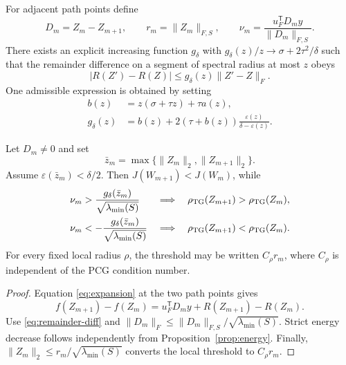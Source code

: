 \documentclass[smallextended]{svjour3}
\newcommand{\T}{\mathsf{T}}
\newcommand{\norm}[1]{\lVert#1\rVert}
\newcommand{\abs}[1]{\lvert#1\rvert}
\begin{document}
For adjacent path points define
\begin{equation}\label{eq:step}
 D_m=Z_m-Z_{m+1},\qquad
 r_m=\norm{Z_m}_{F,S},\qquad
 \nu_m=\frac{u_F^{\T}D_my}{\norm{D_m}_{F,S}}.
\end{equation}
There exists an explicit increasing function $g_\delta$ with
$g_\delta(z)/z\to\sigma+2\tau^2/\delta$ such that the remainder difference on a segment of spectral radius at most $z$ obeys
\begin{equation}\label{eq:remainder-diff}
 \abs{R(Z')-R(Z)}\le g_\delta(z)\norm{Z'-Z}_F.
\end{equation}
One admissible expression is obtained by setting
\begin{align*}
 b(z)&=z(\sigma+\tau z)+\tau a(z),\\
 g_\delta(z)&=b(z)+2(\tau+b(z))\frac{\varepsilon(z)}{\delta-\varepsilon(z)}.
\end{align*}

\begin{theorem}\label{thm:step}
Let $D_m\ne0$ and set
\begin{equation*}
 \bar z_m=\max\{\norm{Z_m}_2,\norm{Z_{m+1}}_2\}.
\end{equation*}
Assume $\varepsilon(\bar z_m)<\delta/2$. Then
$J(W_{m+1})<J(W_m)$, while
\begin{align}
 \nu_m&>\frac{g_\delta(\bar z_m)}{\sqrt{\lambda_{\min}(S)}}
 &&\Longrightarrow\quad \rho_{\rm TG}(Z_{m+1})>\rho_{\rm TG}(Z_m),\label{eq:worse}\\
 \nu_m&<-\frac{g_\delta(\bar z_m)}{\sqrt{\lambda_{\min}(S)}}
 &&\Longrightarrow\quad \rho_{\rm TG}(Z_{m+1})<\rho_{\rm TG}(Z_m).\label{eq:better}
\end{align}
For every fixed local radius $\rho$, the threshold may be written $C_\rho r_m$, where $C_\rho$ is independent of the PCG condition number.
\end{theorem}
\begin{proof}
Equation \eqref{eq:expansion} at the two path points gives
\begin{equation*}
 f(Z_{m+1})-f(Z_m)=u_F^{\T}D_my+R(Z_{m+1})-R(Z_m).
\end{equation*}
Use \eqref{eq:remainder-diff} and
$\norm{D_m}_F\le\norm{D_m}_{F,S}/\sqrt{\lambda_{\min}(S)}$.
Strict energy decrease follows independently from Proposition~\ref{prop:energy}. Finally,
$\norm{Z_m}_2\le r_m/\sqrt{\lambda_{\min}(S)}$ converts the local threshold to $C_\rho r_m$.
\end{proof}
\end{document}
